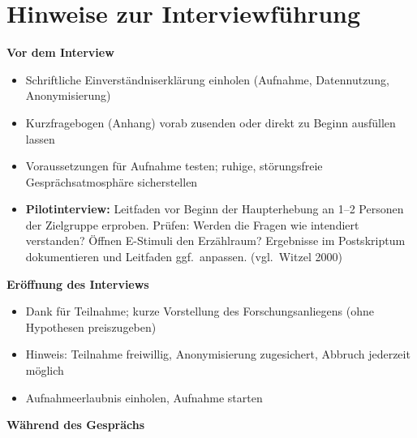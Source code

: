 \blocksep

\section{Hinweise zur Interviewführung}

\vspace{0.4em}

\noindent\textbf{Vor dem Interview}

\begin{itemize}[leftmargin=1.5em, itemsep=1pt, topsep=2pt]
  \item[$\rightarrow$] Schriftliche Einverständniserklärung einholen
    (Aufnahme, Datennutzung, Anonymisierung)
  \item[$\rightarrow$] Kurzfragebogen (Anhang) vorab zusenden oder direkt
    zu Beginn ausfüllen lassen
  \item[$\rightarrow$] Voraussetzungen für Aufnahme testen; ruhige,
    störungsfreie Gesprächsatmosphäre sicherstellen
  \item[$\rightarrow$] \textbf{Pilotinterview:} Leitfaden vor Beginn der
    Haupterhebung an 1–2 Personen der Zielgruppe erproben. Prüfen: Werden
    die Fragen wie intendiert verstanden? Öffnen E-Stimuli den Erzählraum?
    Ergebnisse im Postskriptum dokumentieren und Leitfaden ggf.\ anpassen.
    (vgl.\ Witzel 2000)
\end{itemize}

\vspace{0.4em}
\noindent\textbf{Eröffnung des Interviews}

\begin{itemize}[leftmargin=1.5em, itemsep=1pt, topsep=2pt]
  \item[$\rightarrow$] Dank für Teilnahme; kurze Vorstellung des
    Forschungsanliegens (ohne Hypothesen preiszugeben)
  \item[$\rightarrow$] Hinweis: Teilnahme freiwillig, Anonymisierung
    zugesichert, Abbruch jederzeit möglich
  \item[$\rightarrow$] Aufnahmeerlaubnis einholen, Aufnahme starten
\end{itemize}

\vspace{0.4em}
\noindent\textbf{Während des Gesprächs}


